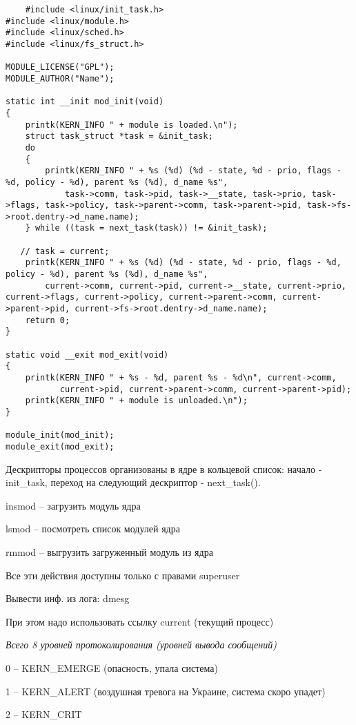 \begin{lstlisting}
    #include <linux/init_task.h>
#include <linux/module.h>
#include <linux/sched.h>
#include <linux/fs_struct.h>

MODULE_LICENSE("GPL");
MODULE_AUTHOR("Name");

static int __init mod_init(void)
{
    printk(KERN_INFO " + module is loaded.\n");
    struct task_struct *task = &init_task;
    do
    {
        printk(KERN_INFO " + %s (%d) (%d - state, %d - prio, flags - %d, policy - %d), parent %s (%d), d_name %s",
            task->comm, task->pid, task->__state, task->prio, task->flags, task->policy, task->parent->comm, task->parent->pid, task->fs->root.dentry->d_name.name);
    } while ((task = next_task(task)) != &init_task);

   // task = current;
    printk(KERN_INFO " + %s (%d) (%d - state, %d - prio, flags - %d, policy - %d), parent %s (%d), d_name %s",
        current->comm, current->pid, current->__state, current->prio, current->flags, current->policy, current->parent->comm, current->parent->pid, current->fs->root.dentry->d_name.name);
    return 0;
}

static void __exit mod_exit(void)
{
    printk(KERN_INFO " + %s - %d, parent %s - %d\n", current->comm,
           current->pid, current->parent->comm, current->parent->pid);
    printk(KERN_INFO " + module is unloaded.\n");
}

module_init(mod_init);
module_exit(mod_exit);
\end{lstlisting}

Дескрипторы процессов организованы в ядре в кольцевой список: начало - init\_task, переход на следующий дескриптор - next\_task().

insmod -- загрузить модуль ядра

lsmod -- посмотреть список модулей ядра

rmmod -- выгрузить загруженный модуль из ядра

Все эти действия доступны только с правами superuser

Вывести инф. из лога: dmesg

При этом надо использовать ссылку current (текущий процесс)

\textit{Всего 8 уровней протоколирования (уровней вывода сообщений)}

0 -- KERN\_EMERGE (опасность, упала система)

1 -- KERN\_ALERT (воздушная тревога на Украине, система скоро упадет)

2 -- KERN\_CRIT 

